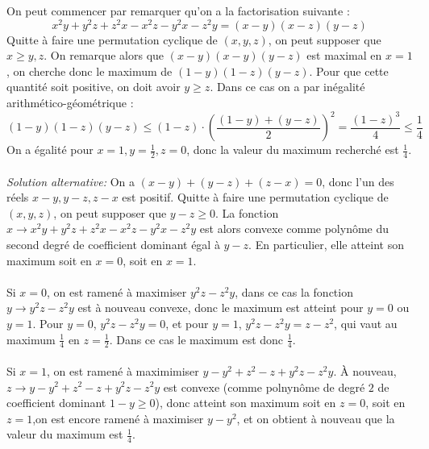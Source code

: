 \begin{sol}
On peut commencer par remarquer qu'on a la factorisation suivante :
$$x^2y + y^2z + z^2x - x^2z - y^2x - z^2y = (x - y)(x - z)(y - z)$$
Quitte à faire une permutation cyclique de $(x, y, z)$, on peut supposer que $x\ge y, z$. On remarque alors que $(x - y)(x - y)(y - z)$ est maximal en $x = 1$, on cherche donc le maximum de $(1 - y)(1 - z)(y - z)$. Pour que cette quantité soit positive, on doit avoir $y\ge z$. Dans ce cas on a par inégalité arithmético-géométrique :
$$(1 - y)(1 - z)(y - z)\leq (1-z)\cdot \left(\frac{(1-y)+(y-z)}{2}\right)^2=\frac{(1-z)^3}{4}\leq \frac{1}{4}$$
On a égalité pour $x = 1, y=\frac{1}{2}, z=0$, donc la valeur du maximum recherché est $\frac{1}{4}$. \\\\
\textit{Solution alternative:} On a $(x-y)+(y-z)+(z-x)=0$, donc l'un des réels $x - y, y - z,z - x$ est positif. Quitte à faire une permutation cyclique de $(x, y, z)$, on peut supposer que $y - z\ge 0$. La fonction $x\to x^2y+y^2z+z^2x-x^2z-y^2x-z^2y$ est alors convexe comme polynôme du second degré de coefficient dominant égal à $y-z$. En particulier, elle atteint son maximum soit en $x=0$, soit en $x=1$.\\\\
Si $x=0$, on est ramené à maximiser $y^2z-z^2y$, dans ce cas la fonction $y\to y^2z-z^2y$ est à nouveau convexe, donc le maximum est atteint pour $y=0$ ou $y=1$. Pour $y=0$, $y^2z-z^2y=0$, et pour $y=1$, $y^2z-z^2y=z-z^2$, qui vaut au maximum $\frac{1}{4}$ en $z=\frac{1}{2}$. Dans ce cas le maximum est donc $\frac{1}{4}$. \\\\
Si $x=1$, on est ramené à maximimiser $y-y^2+z^2-z+y^2z-z^2y$. À nouveau, $z\to y-y^2+z^2-z+y^2z-z^2y$ est convexe (comme polnynôme de degré $2$ de coefficient dominant $1-y\ge 0$), donc atteint son maximum soit en $z=0$, soit en $z=1$,on est encore ramené à maximiser $y-y^2$, et on obtient à nouveau que la valeur du maximum est $\frac{1}{4}$.
\end{sol}


